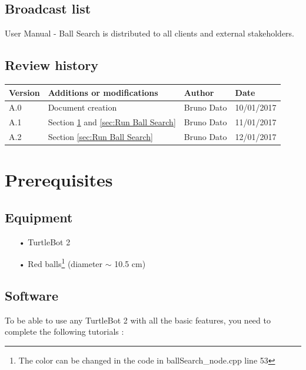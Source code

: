 \documentclass[10pt,a4paper]{article}
\begin{document}
\subsection*{Broadcast list}

User Manual - Ball Search is distributed to all clients and external stakeholders.

\subsection*{Review history}

\begin{center}
    \begin{tabular}{| l | l | l | l |}
    \hline
     \rowcolor{gray} Version & Additions or modifications & Author & Date \\ \hline
    A.0 & Document creation & Bruno Dato & 10/01/2017\\ \hline
    A.1 & Section \ref{sec:Prerequisites} and \ref{sec:Run Ball Search}  & Bruno Dato & 11/01/2017\\ \hline
    A.2 & Section \ref{sec:Run Ball Search}  & Bruno Dato & 12/01/2017\\ \hline
     
    \end{tabular}
\end{center}

\newpage
\tableofcontents
\newpage
	

\section{Prerequisites}
\label{sec:Prerequisites}

\subsection{Equipment}

\begin{itemize}
\item[•] TurtleBot 2
\item[•] Red balls\footnote{The color can be changed in the code in ballSearch\_node.cpp line 53} (diameter $\sim$ 10.5 cm)
\end{itemize}

\subsection{Software}

To be able to use any TurtleBot 2 with all the basic features, you need to complete the following tutorials :
\end{document}
